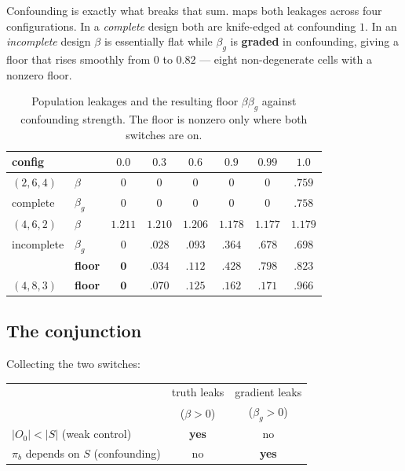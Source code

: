\documentclass{article}
\theoremstyle{plain}
\theoremstyle{definition}
\begin{document}
Confounding is exactly what breaks that sum.  maps both leakages
across four configurations. In a \emph{complete} design both are knife-edged at
confounding $1$. In an \emph{incomplete} design $\beta$ is essentially flat while
$\beta_g$ is \textbf{graded} in confounding, giving a floor that rises smoothly
from $0$ to $0.82$ --- eight non-degenerate cells with a nonzero floor.

\begin{table}[t]
\caption{Population leakages and the resulting floor $\beta\beta_g$ against
confounding strength. The floor is nonzero only where both switches are on.}
\label{tab:floor}
\begin{center}\small
\begin{tabular}{@{}llcccccc@{}}
\toprule
config & & $0.0$ & $0.3$ & $0.6$ & $0.9$ & $0.99$ & $1.0$ \\
\midrule
$(2,6,4)$  & $\beta$   & $0$ & $0$ & $0$ & $0$ & $0$ & $.759$ \\
complete   & $\beta_g$ & $0$ & $0$ & $0$ & $0$ & $0$ & $.758$ \\
\midrule
$(4,6,2)$  & $\beta$   & $1.211$ & $1.210$ & $1.206$ & $1.178$ & $1.177$ & $1.179$ \\
incomplete & $\beta_g$ & $0$ & $.028$ & $.093$ & $.364$ & $.678$ & $.698$ \\
           & \textbf{floor} & $\mathbf{0}$ & $\mathbf{.034}$ & $\mathbf{.112}$
           & $\mathbf{.428}$ & $\mathbf{.798}$ & $\mathbf{.823}$ \\
\midrule
$(4,8,3)$  & \textbf{floor} & $\mathbf{0}$ & $\mathbf{.070}$ & $\mathbf{.125}$
           & $\mathbf{.162}$ & $\mathbf{.171}$ & $\mathbf{.966}$ \\
\bottomrule
\end{tabular}
\end{center}
\end{table}

\subsection{The conjunction}
\label{sec:conjunction}

Collecting the two switches:

\begin{center}\small
\begin{tabular}{@{}lcc@{}}
\toprule
 & truth leaks & gradient leaks \\
 & ($\beta>0$) & ($\beta_g>0$) \\
\midrule
$|O_0| < |S|$ (weak control) & \textbf{yes} & no \\
$\pi_b$ depends on $S$ (confounding) & no & \textbf{yes} \\
\bottomrule
\end{tabular}
\end{center}
\end{document}
